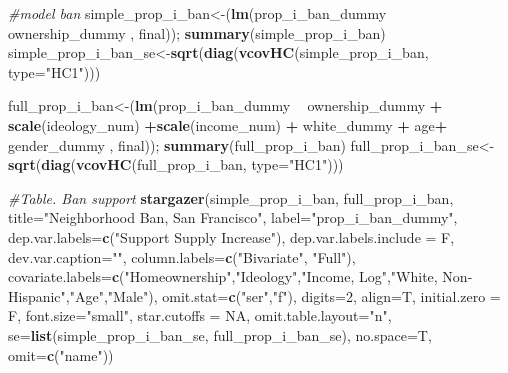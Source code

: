 \documentclass[]{article}
\newenvironment{Shaded}{\begin{snugshade}}{\end{snugshade}}
\newcommand{\CommentTok}[1]{\textcolor[rgb]{0.56,0.35,0.01}{\textit{#1}}}
\newcommand{\DataTypeTok}[1]{\textcolor[rgb]{0.13,0.29,0.53}{#1}}
\newcommand{\DecValTok}[1]{\textcolor[rgb]{0.00,0.00,0.81}{#1}}
\newcommand{\KeywordTok}[1]{\textcolor[rgb]{0.13,0.29,0.53}{\textbf{#1}}}
\newcommand{\NormalTok}[1]{#1}
\newcommand{\OperatorTok}[1]{\textcolor[rgb]{0.81,0.36,0.00}{\textbf{#1}}}
\newcommand{\OtherTok}[1]{\textcolor[rgb]{0.56,0.35,0.01}{#1}}
\newcommand{\StringTok}[1]{\textcolor[rgb]{0.31,0.60,0.02}{#1}}
\begin{document}
\begin{Shaded}
\begin{Highlighting}[]
{{\CommentTok{#model ban}
\NormalTok{simple_prop_i_ban<-(}\KeywordTok{lm}\NormalTok{(prop_i_ban_dummy }\OperatorTok{~}\StringTok{ }\NormalTok{ownership_dummy  , final)); }\KeywordTok{summary}\NormalTok{(simple_prop_i_ban)}
\NormalTok{simple_prop_i_ban_se<-}\KeywordTok{sqrt}\NormalTok{(}\KeywordTok{diag}\NormalTok{(}\KeywordTok{vcovHC}\NormalTok{(simple_prop_i_ban, }\DataTypeTok{type=}\StringTok{"HC1"}\NormalTok{)))}

\NormalTok{full_prop_i_ban<-(}\KeywordTok{lm}\NormalTok{(prop_i_ban_dummy }\OperatorTok{~}\StringTok{ }\NormalTok{ownership_dummy  }\OperatorTok{+}\StringTok{  }\KeywordTok{scale}\NormalTok{(ideology_num) }\OperatorTok{+}\KeywordTok{scale}\NormalTok{(income_num) }\OperatorTok{+}\StringTok{ }\NormalTok{white_dummy  }\OperatorTok{+}\StringTok{ }\NormalTok{age}\OperatorTok{+}\StringTok{ }\NormalTok{gender_dummy , final)); }\KeywordTok{summary}\NormalTok{(full_prop_i_ban)}
\NormalTok{full_prop_i_ban_se<-}\KeywordTok{sqrt}\NormalTok{(}\KeywordTok{diag}\NormalTok{(}\KeywordTok{vcovHC}\NormalTok{(full_prop_i_ban, }\DataTypeTok{type=}\StringTok{"HC1"}\NormalTok{)))}

\CommentTok{#Table. Ban support}
\KeywordTok{stargazer}\NormalTok{(simple_prop_i_ban, full_prop_i_ban, }\DataTypeTok{title=}\StringTok{"Neighborhood Ban, San Francisco"}\NormalTok{,  }\DataTypeTok{label=}\StringTok{"prop_i_ban_dummy"}\NormalTok{,}
          \DataTypeTok{dep.var.labels=}\KeywordTok{c}\NormalTok{(}\StringTok{"Support Supply Increase"}\NormalTok{), }\DataTypeTok{dep.var.labels.include =}\NormalTok{ F, }\DataTypeTok{dev.var.caption=}\StringTok{""}\NormalTok{,}
          \DataTypeTok{column.labels=}\KeywordTok{c}\NormalTok{(}\StringTok{"Bivariate"}\NormalTok{, }\StringTok{"Full"}\NormalTok{),}
          \DataTypeTok{covariate.labels=}\KeywordTok{c}\NormalTok{(}\StringTok{"Homeownership"}\NormalTok{,}\StringTok{"Ideology"}\NormalTok{,}\StringTok{"Income, Log"}\NormalTok{,}\StringTok{"White, Non-Hispanic"}\NormalTok{,}\StringTok{"Age"}\NormalTok{,}\StringTok{"Male"}\NormalTok{),}
          \DataTypeTok{omit.stat=}\KeywordTok{c}\NormalTok{(}\StringTok{"ser"}\NormalTok{,}\StringTok{"f"}\NormalTok{), }\DataTypeTok{digits=}\DecValTok{2}\NormalTok{, }\DataTypeTok{align=}\NormalTok{T,}
          \DataTypeTok{initial.zero =}\NormalTok{ F, }\DataTypeTok{font.size=}\StringTok{"small"}\NormalTok{, }\DataTypeTok{star.cutoffs =} \OtherTok{NA}\NormalTok{, }\DataTypeTok{omit.table.layout=}\StringTok{"n"}\NormalTok{,}
          \DataTypeTok{se=}\KeywordTok{list}\NormalTok{(simple_prop_i_ban_se, full_prop_i_ban_se), }\DataTypeTok{no.space=}\NormalTok{T, }\DataTypeTok{omit=}\KeywordTok{c}\NormalTok{(}\StringTok{"name"}\NormalTok{))}

}}
\end{Highlighting}
\end{Shaded}
\end{document}
